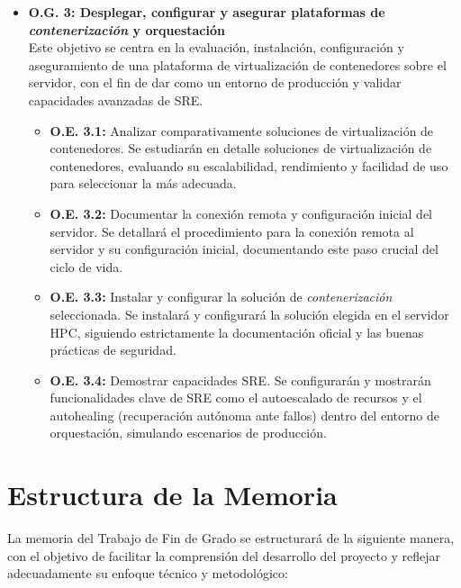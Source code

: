 \begin{itemize}
\begin{itemize}
    \end{itemize}
    \item \textbf{O.G. 3: Desplegar, configurar y asegurar plataformas de \textit{contenerización} y orquestación}\\
    Este objetivo se centra en la evaluación, instalación, configuración y aseguramiento de una plataforma de virtualización de contenedores sobre el servidor, con el fin de dar como un entorno de producción y validar capacidades avanzadas de SRE.
    \begin{itemize}
        \item \textbf{O.E. 3.1:} Analizar comparativamente soluciones de virtualización de contenedores. Se estudiarán en detalle soluciones de virtualización de contenedores, evaluando su escalabilidad, rendimiento y facilidad de uso para seleccionar la más adecuada.
        \item \textbf{O.E. 3.2:} Documentar la conexión remota y configuración inicial del servidor. Se detallará el procedimiento para la conexión remota al servidor y su configuración inicial, documentando este paso crucial del ciclo de vida.
        \item \textbf{O.E. 3.3:} Instalar y configurar la solución de \textit{contenerización} seleccionada. Se instalará y configurará la solución elegida en el servidor HPC, siguiendo estrictamente la documentación oficial y las buenas prácticas de seguridad.
        \item \textbf{O.E. 3.4:} Demostrar capacidades SRE. Se configurarán y mostrarán funcionalidades clave de SRE como el autoescalado de recursos y el autohealing (recuperación autónoma ante fallos) dentro del entorno de orquestación, simulando escenarios de producción.
    \end{itemize}
\end{itemize}

\section{Estructura de la Memoria}
La memoria del Trabajo de Fin de Grado se estructurará de la siguiente manera, con el objetivo de facilitar la comprensión del desarrollo del proyecto y reflejar adecuadamente su enfoque técnico y metodológico:

